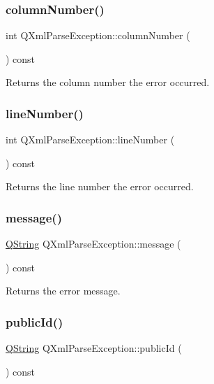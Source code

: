 \subsubsection{\texorpdfstring{columnNumber()}{columnNumber()}}
{\footnotesize\ttfamily int Q\+Xml\+Parse\+Exception\+::column\+Number (\begin{DoxyParamCaption}{ }\end{DoxyParamCaption}) const}

Returns the column number the error occurred. \mbox{\label{class_q_xml_parse_exception_a342274677e7ea114c23dbb5dda8aa3da}} 
\subsubsection{\texorpdfstring{lineNumber()}{lineNumber()}}
{\footnotesize\ttfamily int Q\+Xml\+Parse\+Exception\+::line\+Number (\begin{DoxyParamCaption}{ }\end{DoxyParamCaption}) const}

Returns the line number the error occurred. \mbox{\label{class_q_xml_parse_exception_a2079f8dab183efb5f2fe30c686e96f12}} 
\subsubsection{\texorpdfstring{message()}{message()}}
{\footnotesize\ttfamily \mbox{\hyperlink{class_q_string}{Q\+String}} Q\+Xml\+Parse\+Exception\+::message (\begin{DoxyParamCaption}{ }\end{DoxyParamCaption}) const}

Returns the error message. \mbox{\label{class_q_xml_parse_exception_aca4a620727773b30d458991237cd39eb}} 
\subsubsection{\texorpdfstring{publicId()}{publicId()}}
{\footnotesize\ttfamily \mbox{\hyperlink{class_q_string}{Q\+String}} Q\+Xml\+Parse\+Exception\+::public\+Id (\begin{DoxyParamCaption}{ }\end{DoxyParamCaption}) const}

